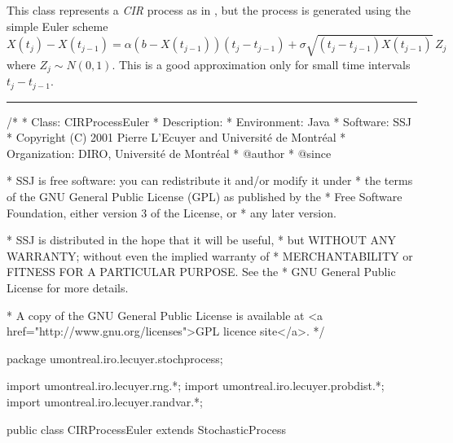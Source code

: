 
This class represents a \emph{CIR} process
as in , but
the process is generated using the simple Euler scheme
\begin{equation}
   X(t_j) - X(t_{j-1}) = \alpha(b - X(t_{j-1}))(t_j - t_{j-1}) +
      \sigma \sqrt{(t_j - t_{j-1})X(t_{j-1})}\, Z_j
                                    \label{eq:cir-seq-euler}
\end{equation}
where $Z_j \sim N(0,1)$. This is a good approximation only for small
time intervals $t_j - t_{j-1}$.

\bigskip\hrule\bigskip

\begin{code}
\begin{hide}
/*
 * Class:        CIRProcessEuler
 * Description:  
 * Environment:  Java
 * Software:     SSJ 
 * Copyright (C) 2001  Pierre L'Ecuyer and Université de Montréal
 * Organization: DIRO, Université de Montréal
 * @author       
 * @since

 * SSJ is free software: you can redistribute it and/or modify it under
 * the terms of the GNU General Public License (GPL) as published by the
 * Free Software Foundation, either version 3 of the License, or
 * any later version.

 * SSJ is distributed in the hope that it will be useful,
 * but WITHOUT ANY WARRANTY; without even the implied warranty of
 * MERCHANTABILITY or FITNESS FOR A PARTICULAR PURPOSE.  See the
 * GNU General Public License for more details.

 * A copy of the GNU General Public License is available at
   <a href="http://www.gnu.org/licenses">GPL licence site</a>.
 */
\end{hide}
package umontreal.iro.lecuyer.stochprocess;\begin{hide}
import umontreal.iro.lecuyer.rng.*;
import umontreal.iro.lecuyer.probdist.*;
import umontreal.iro.lecuyer.randvar.*;

\end{hide}

public class CIRProcessEuler extends StochasticProcess \begin{hide} {
    protected NormalGen    gen;
    protected double       alpha,
                           beta,
                           sigma;
    // Precomputed values
    protected double[]     alphadt,
                           sigmasqrdt;
\end{hide}
\end{code}
